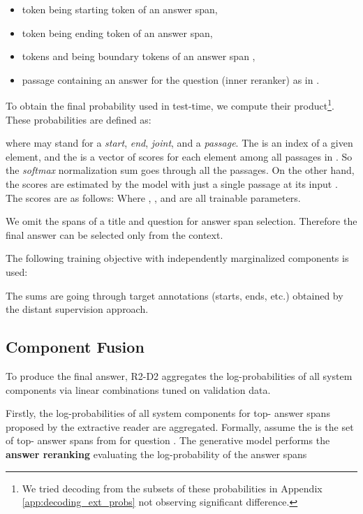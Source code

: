 \documentclass[11pt]{article}
\begin{document}
\begin{itemize}
    \setlength\parskip{0em}
    \item token  being starting token of an answer span,
    \item token  being ending token of an answer span,
    \item tokens  and  being boundary tokens of an answer span \cite{fajcik2020rethinking},
    \item passage  containing an answer for the question  (inner reranker) as in \citet{karpukhin2020dense}.
\end{itemize}



To obtain the final probability used in test-time, we compute their product\footnote{We tried decoding from the subsets of these probabilities in Appendix \ref{app:decoding_ext_probs} not observing significant difference.}. These probabilities are defined as:

where  may stand for a \emph{start}, \emph{end}, \emph{joint}, and a \emph{passage}. The  is an index of a given element, and the  is a vector of scores for each element among all passages in . So the \emph{softmax} normalization sum goes through all the passages. On the other hand, the  scores are estimated by the model with just a single passage at its input \cite{clark-gardner-2018-simple}. The scores are as follows:
\setlength{\jot}{1ex}
Where , , and  are all trainable parameters.

We omit the spans of a title and question for answer span selection. Therefore the final answer can be selected only from the context.

The following training objective with independently marginalized components is used:


The sums are going through target annotations (starts, ends, etc.) obtained by the distant supervision approach.











\subsection{Component Fusion}
\label{ss:fusions}
To produce the final answer, R2-D2 aggregates the log-probabilities of all system components via linear combinations tuned on validation data.  

Firstly, the log-probabilities of all system components for top- answer spans proposed by the extractive reader are aggregated. Formally, assume the  is the set of top- answer spans from  for question .
The generative model performs  the \textbf{answer reranking} evaluating the log-probability of the answer spans 
\end{document}
